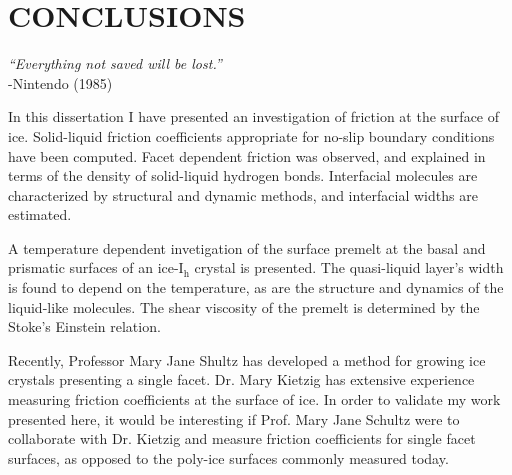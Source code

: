 \chapter{CONCLUSIONS}\label{chap:Concl}

\begin{flushright}
\textit{``Everything not saved will be lost.''} \\
-Nintendo (1985) \\
\end{flushright}

In this dissertation I have presented an investigation of friction at
the surface of ice. Solid-liquid friction coefficients appropriate for
no-slip boundary conditions have been computed. Facet dependent
friction was observed, and explained in terms of the density of
solid-liquid hydrogen bonds. Interfacial molecules are characterized
by structural and dynamic methods, and interfacial widths are
estimated. 

A temperature dependent invetigation of the surface premelt at the
basal and prismatic surfaces of an ice-I$_\mathrm{h}$ crystal is
presented. The quasi-liquid layer's width is found to depend on the
temperature, as are the structure and dynamics of the liquid-like
molecules. The shear viscosity of the premelt is determined by the
Stoke's Einstein relation. 

Recently, Professor Mary Jane Shultz has developed a method for
growing ice crystals presenting a single facet. Dr. Mary Kietzig has
extensive experience measuring friction coefficients at the surface of
ice. In order to validate my work presented here, it would be
interesting if Prof. Mary Jane Schultz were to collaborate with
Dr. Kietzig and measure friction coefficients for single facet
surfaces, as opposed to the poly-ice surfaces commonly measured
today. 
